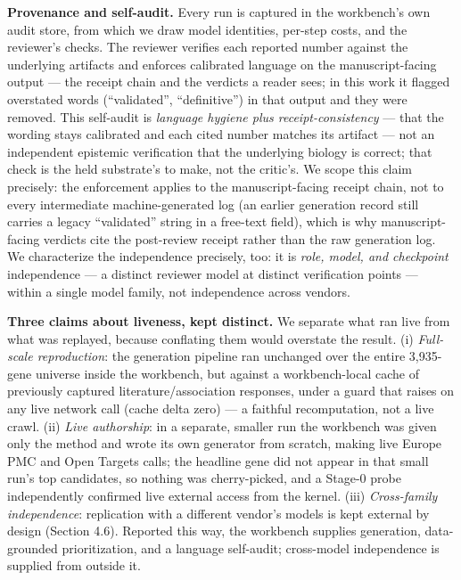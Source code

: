 \noindent \textbf{Provenance and self-audit.} Every run is captured in the workbench's own audit store, from which we
draw model identities, per-step costs, and the reviewer's checks. The reviewer verifies each reported
number against the underlying artifacts and enforces calibrated language on the manuscript-facing output ---
the receipt chain and the verdicts a reader sees; in this work it flagged overstated words (``validated'',
``definitive'') in that output and they were removed. This self-audit is \emph{language hygiene plus
receipt-consistency} --- that the wording stays calibrated and each cited number matches its artifact --- not
an independent epistemic verification that the underlying biology is correct; that check is the held
substrate's to make, not the critic's. We scope this claim precisely: the enforcement applies
to the manuscript-facing receipt chain, not to every intermediate machine-generated log (an earlier
generation record still carries a legacy ``validated'' string in a free-text field), which is why
manuscript-facing verdicts cite the post-review receipt rather than the raw generation log. We characterize
the independence precisely, too: it is \emph{role, model, and checkpoint} independence --- a distinct reviewer
model at distinct verification points --- within a single model family, not independence across vendors.

\noindent \textbf{Three claims about liveness, kept distinct.} We separate what ran live from what was replayed, because
conflating them would overstate the result. (i) \emph{Full-scale reproduction}: the generation pipeline ran
unchanged over the entire 3,935-gene universe inside the workbench, but against a workbench-local cache of
previously captured literature/association responses, under a guard that raises on any live network call
(cache delta zero) --- a faithful recomputation, not a live crawl. (ii) \emph{Live authorship}: in a separate,
smaller run the workbench was given only the method and wrote its own generator from scratch, making live
Europe PMC and Open Targets calls; the headline gene did not appear in that small run's top candidates, so
nothing was cherry-picked, and a Stage-0 probe independently confirmed live external access from the
kernel. (iii) \emph{Cross-family independence}: replication with a different vendor's models is kept external
by design (Section 4.6). Reported this way, the workbench supplies generation, data-grounded
prioritization, and a language self-audit; cross-model independence is supplied from outside it.
